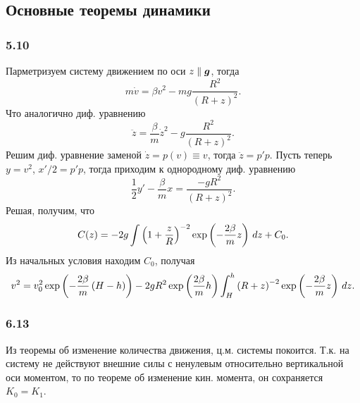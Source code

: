\subsection{Основные теоремы динамики}

\subsubsection*{5.10}

Парметризуем систему движением по оси $z \parallel \mbox{\boldmath $g$}$, тогда
\begin{equation}
    m \dot{v} = \beta v^2 - mg \frac{R^2}{(R+z)^2}.
\end{equation}
Что аналогично диф. уравнению
\begin{equation}
    \ddot{z} = \frac{\beta}{m} \dot{z}^2 - g \frac{R^2}{(R+z)^2} .
\end{equation}
Решим диф. уравнение заменой $\dot{z} = p(v) \equiv v$, тогда $\ddot{z} = p'p$.
Пусть теперь $y = v^2$, $x'/2 = p'p$, тогда приходим к однородному диф. уравнению
\begin{equation}
    \frac{1}{2} y' - \frac{\beta}{m} x = \frac{-gR^2}{(R+z)^2}.
\end{equation}
Решая, получим, что
\begin{equation}
    C(z) = -2g \int \left(1 + \frac{z}{R} \right)^{-2} \exp\left(-\frac{2\beta}{m} z\right) \, d z + C_0.
\end{equation}
Из начальных условия  находим $C_0$, получая
\begin{equation}
    v^2 = v_0^2 \exp\left(-\frac{2\beta}{m} \left(H-h\right)\right)
    -2gR^2 \exp\left(\frac{2\beta}{m} h\right)
    \int_{H}^{h} \left(R+z\right)^{-2} \exp\left(-\frac{2\beta}{m} z\right)\, d z.
\end{equation}


\subsubsection*{6.13}

Из теоремы об изменение количества движения, ц.м. системы покоится. Т.к. на систему не действуют внешние силы с ненулевым относительно вертикальной оси моментом, то по теореме об изменение кин. момента, он сохраняется $K_0 = K_1$. 

